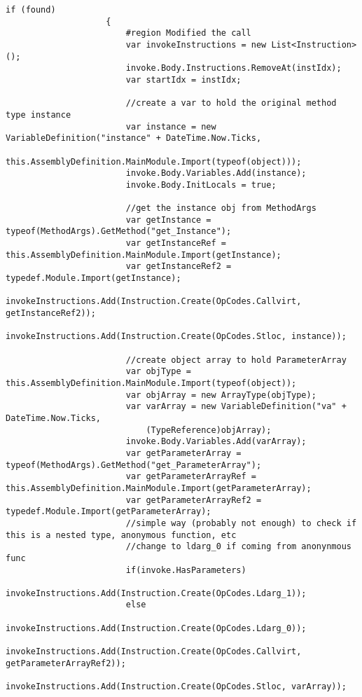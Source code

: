 \begin{lstlisting}[caption={../buffalo/Injectors/MethodAroundInjector.cs}, label=../buffalo/Injectors/MethodAroundInjector.cs, frame=tb, basicstyle=\scriptsize]
                    if (found)
                    {
                        #region Modified the call
                        var invokeInstructions = new List<Instruction>();
                        invoke.Body.Instructions.RemoveAt(instIdx);
                        var startIdx = instIdx;

                        //create a var to hold the original method type instance
                        var instance = new VariableDefinition("instance" + DateTime.Now.Ticks,
                            this.AssemblyDefinition.MainModule.Import(typeof(object)));
                        invoke.Body.Variables.Add(instance);
                        invoke.Body.InitLocals = true;

                        //get the instance obj from MethodArgs
                        var getInstance = typeof(MethodArgs).GetMethod("get_Instance");
                        var getInstanceRef = this.AssemblyDefinition.MainModule.Import(getInstance);
                        var getInstanceRef2 = typedef.Module.Import(getInstance);
                        invokeInstructions.Add(Instruction.Create(OpCodes.Callvirt, getInstanceRef2));
                        invokeInstructions.Add(Instruction.Create(OpCodes.Stloc, instance));

                        //create object array to hold ParameterArray
                        var objType = this.AssemblyDefinition.MainModule.Import(typeof(object));
                        var objArray = new ArrayType(objType);
                        var varArray = new VariableDefinition("va" + DateTime.Now.Ticks,
                            (TypeReference)objArray);
                        invoke.Body.Variables.Add(varArray);
                        var getParameterArray = typeof(MethodArgs).GetMethod("get_ParameterArray");
                        var getParameterArrayRef = this.AssemblyDefinition.MainModule.Import(getParameterArray);
                        var getParameterArrayRef2 = typedef.Module.Import(getParameterArray);
                        //simple way (probably not enough) to check if this is a nested type, anonymous function, etc
                        //change to ldarg_0 if coming from anonynmous func
                        if(invoke.HasParameters)
                            invokeInstructions.Add(Instruction.Create(OpCodes.Ldarg_1)); 
                        else
                            invokeInstructions.Add(Instruction.Create(OpCodes.Ldarg_0)); 
                        invokeInstructions.Add(Instruction.Create(OpCodes.Callvirt, getParameterArrayRef2));
                        invokeInstructions.Add(Instruction.Create(OpCodes.Stloc, varArray));


\end{lstlisting}
